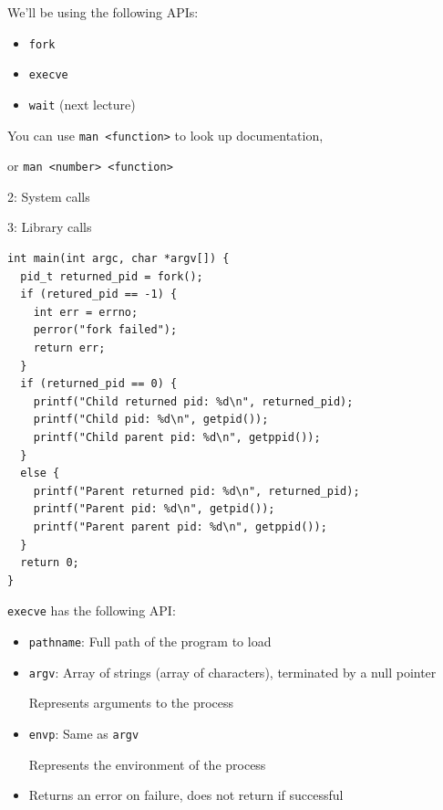   \begin{slide}


    We'll be using the following APIs:
    \begin{itemize}
      \item \texttt{fork}
      \item \texttt{execve}
      \item \texttt{wait} (next lecture)
    \end{itemize}
    \medskip

    You can use \texttt{man <function>} to look up documentation,

    or \texttt{man <number> <function>}

    \leftspace{}2: System calls

    \leftspace{}3: Library calls

  \end{slide}

  \begin{slide}


    \begin{verbatim}
int main(int argc, char *argv[]) {
  pid_t returned_pid = fork();
  if (retured_pid == -1) {
    int err = errno;
    perror("fork failed");
    return err;
  }
  if (returned_pid == 0) {
    printf("Child returned pid: %d\n", returned_pid);
    printf("Child pid: %d\n", getpid());
    printf("Child parent pid: %d\n", getppid());
  }
  else {
    printf("Parent returned pid: %d\n", returned_pid);
    printf("Parent pid: %d\n", getpid());
    printf("Parent parent pid: %d\n", getppid());
  }
  return 0;
}
    \end{verbatim}

  \end{slide}

  \begin{slide}


    \texttt{execve} has the following API:
    \begin{itemize}
      \item \texttt{pathname}: Full path of the program to load
      \item \texttt{argv}: Array of strings (array of characters), terminated by
             a null pointer

            \leftspace{}Represents arguments to the process
      \item \texttt{envp}: Same as \texttt{argv}

            \leftspace{}Represents the environment of the process
      \item Returns an error on failure, does not return if successful
    \end{itemize}
  \end{slide}


